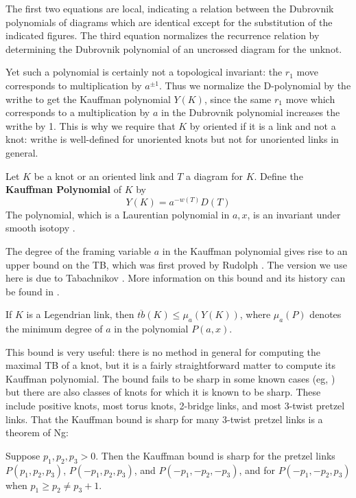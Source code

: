 The first two equations are local, indicating a relation between the Dubrovnik polynomials of diagrams which are identical except for the substitution of the indicated figures. The third equation normalizes the recurrence relation by determining the Dubrovnik polynomial of an uncrossed diagram for the unknot.

Yet such a polynomial is certainly not a topological invariant: the $r_1$ move corresponds to multiplication by $a^{\pm 1}$. Thus we normalize the D-polynomial by the writhe to get the Kauffman polynomial $Y(K)$, since the same $r_1$ move which corresponds to a multiplication by $a$ in the Dubrovnik polynomial increases the writhe by 1. This is why we require that $K$ by oriented if it is a link and not a knot: writhe is well-defined for unoriented knots but not for unoriented links in general.
\begin{definition}
    Let $K$ be a knot or an oriented link and $T$ a diagram for $K$. Define the \textbf{Kauffman Polynomial} of $K$ by
    \[
        Y(K) = a^{-w(T)} D(T)
    \]
    The polynomial, which is a Laurentian polynomial in $a, x$, is an invariant under smooth isotopy \cite{kauffman}.
\end{definition}

The degree of the framing variable $a$ in the Kauffman polynomial gives rise to an upper bound on the TB, which was first proved by Rudolph \cite{rudolph}. The version we use here is due to Tabachnikov \cite{tabachnikov}. More information on this bound and its history can be found in \cite{ferrand}.

\begin{theorem}\label{kauffman-bound}
    If $K$ is a Legendrian link, then $\overline{tb}(K) \leq \mu_a(Y(K))$, where $\mu_a(P)$ denotes the minimum degree of $a$ in the polynomial $P(a, x)$.
\end{theorem}

This bound is very useful: there is no method in general for computing the maximal TB of a knot, but it is a fairly straightforward matter to compute its Kauffman polynomial. The bound fails to be sharp in some known cases (eg, \cite{ferrand}) but there are also classes of knots for which it is known to be sharp. These include positive knots, most torus knots, 2-bridge links, and most 3-twist pretzel links. That the Kauffman bound is sharp for many 3-twist pretzel links is a theorem of Ng:

\begin{theorem}[\cite{ng}]
    Suppose $p_1, p_2, p_3 > 0$. Then the Kauffman bound is sharp for the pretzel links $P(p_1, p_2, p_3)$, $P(-p_1, p_2, p_3)$, and $P(-p_1, -p_2, -p_3)$, and for $P(-p_1, -p_2, p_3)$ when $p_1 \geq p_2 \neq p_3 + 1$.
\end{theorem}

